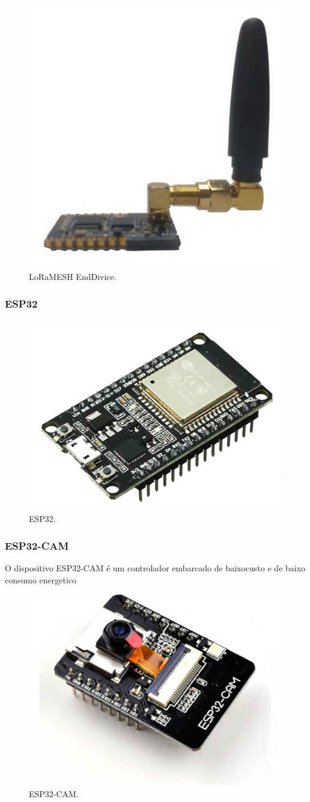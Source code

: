 \documentclass[
article,			%
12pt,				%
oneside,			%
a4paper,			%
english,			%
brazil,				%
sumario=tradicional
]{abntex2}
\begin{document}
\begin{figure}[!h]
  \caption{\label{fig:recivier}LoRaMESH EndDivice.}
  \centering
  \includegraphics[width=.5\textwidth]{lora}
\end{figure}

\subsubsection{ESP32}\label{ESP32}

\begin{figure}[!h]
  \caption{\label{fig:recivier}ESP32.}
  \centering
  \includegraphics[width=.5\textwidth]{esp}
\end{figure}

\subsubsection{ESP32-CAM}\label{ESP32-CAM}
O dispositivo ESP32-CAM é um controlador embarcado de baixocusto e de baixo consumo energetico

\begin{figure}[!h]
  \caption{\label{fig:recivier}ESP32-CAM.}
  \centering
  \includegraphics[width=.5\textwidth]{espcam}
\end{figure}
\end{document}
